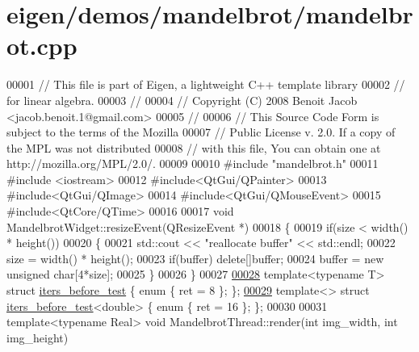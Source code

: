 \hypertarget{eigen_2demos_2mandelbrot_2mandelbrot_8cpp_source}{}\section{eigen/demos/mandelbrot/mandelbrot.cpp}
\label{eigen_2demos_2mandelbrot_2mandelbrot_8cpp_source}

\begin{DoxyCode}
00001 \textcolor{comment}{// This file is part of Eigen, a lightweight C++ template library}
00002 \textcolor{comment}{// for linear algebra.}
00003 \textcolor{comment}{//}
00004 \textcolor{comment}{// Copyright (C) 2008 Benoit Jacob <jacob.benoit.1@gmail.com>}
00005 \textcolor{comment}{//}
00006 \textcolor{comment}{// This Source Code Form is subject to the terms of the Mozilla}
00007 \textcolor{comment}{// Public License v. 2.0. If a copy of the MPL was not distributed}
00008 \textcolor{comment}{// with this file, You can obtain one at http://mozilla.org/MPL/2.0/.}
00009 
00010 \textcolor{preprocessor}{#include "mandelbrot.h"}
00011 \textcolor{preprocessor}{#include <iostream>}
00012 \textcolor{preprocessor}{#include<QtGui/QPainter>}
00013 \textcolor{preprocessor}{#include<QtGui/QImage>}
00014 \textcolor{preprocessor}{#include<QtGui/QMouseEvent>}
00015 \textcolor{preprocessor}{#include<QtCore/QTime>}
00016 
00017 \textcolor{keywordtype}{void} MandelbrotWidget::resizeEvent(QResizeEvent *)
00018 \{
00019   \textcolor{keywordflow}{if}(size < width() * height())
00020   \{
00021     std::cout << \textcolor{stringliteral}{"reallocate buffer"} << std::endl;
00022     size = width() * height();
00023     \textcolor{keywordflow}{if}(buffer) \textcolor{keyword}{delete}[]buffer;
00024     buffer = \textcolor{keyword}{new} \textcolor{keywordtype}{unsigned} \textcolor{keywordtype}{char}[4*size];
00025   \}
00026 \}
00027 
\hyperlink{structiters__before__test}{00028} \textcolor{keyword}{template}<\textcolor{keyword}{typename} T> \textcolor{keyword}{struct }\hyperlink{structiters__before__test}{iters\_before\_test} \{ \textcolor{keyword}{enum} \{ ret = 8 \}; \};
\hyperlink{structiters__before__test_3_01double_01_4}{00029} \textcolor{keyword}{template}<> \textcolor{keyword}{struct }\hyperlink{structiters__before__test}{iters\_before\_test}<double> \{ \textcolor{keyword}{enum} \{ ret = 16 \}; \};
00030 
00031 \textcolor{keyword}{template}<\textcolor{keyword}{typename} Real> \textcolor{keywordtype}{void} MandelbrotThread::render(\textcolor{keywordtype}{int} img\_width, \textcolor{keywordtype}{int} img\_height)

\end{DoxyCode}
